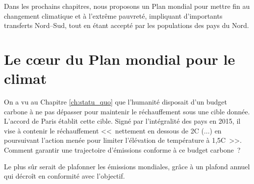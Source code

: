 \documentclass[a5paper,french,openany]{memoir}
\begin{document}
Dans les prochains chapitres, nous proposons un Plan mondial pour mettre fin au changement climatique et à l'extrême pauvreté, impliquant d'importants transferts Nord--Sud, tout en étant accepté par %
les populations des pays du Nord.




\chapter{Le cœur du Plan mondial pour le climat\label{ch:coeur}}

On a vu au Chapitre \ref{ch:statu_quo} que l'humanité disposait d'un budget carbone à ne pas dépasser pour maintenir le réchauffement sous une cible donnée. L'accord de Paris établit cette cible. Signé par l'intégralité des pays en 2015, il vise à contenir le réchauffement <<~nettement en dessous de 2\textdegree{}C (...) en poursuivant l'action menée pour limiter l'élévation de température à 1,5\textdegree{}C~>>. \\

Comment garantir une trajectoire d'émissions conforme à ce budget carbone~? 

Le plus sûr serait de plafonner les émissions mondiales, grâce à un plafond annuel qui décroît en conformité avec l'objectif. \\
\end{document}
